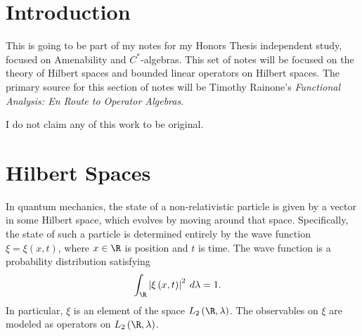 \documentclass[10pt]{mypackage}
\begin{document}
\RaggedRight
\tableofcontents
\section{Introduction}%
This is going to be part of my notes for my Honors Thesis independent study, focused on Amenability and $C^{\ast}$-algebras. This set of notes will be focused on the theory of Hilbert spaces and bounded linear operators on Hilbert spaces. The primary source for this section of notes will be Timothy Rainone's \textit{Functional Analysis: En Route to Operator Algebras}.\newline

I do not claim any of this work to be original.
\section{Hilbert Spaces}%
In quantum mechanics, the state of a non-relativistic particle is given by a vector in some Hilbert space, which evolves by moving around that space. Specifically, the state of such a particle is determined entirely by the wave function $\xi = \xi\left(x,t\right)$, where $x\in \R$ is position and $t$ is time. The wave function is a probability distribution satisfying
\begin{align*}
  \int_{\R}^{} \left\vert \xi\left(x,t\right) \right\vert^2\:d\lambda &= 1.
\end{align*}
In particular, $\xi$ is an element of the space $L_{2}\left(\R,\lambda\right)$. The observables on $\xi$ are modeled as operators on $L_{2}\left(\R,\lambda\right)$.
\end{document}
